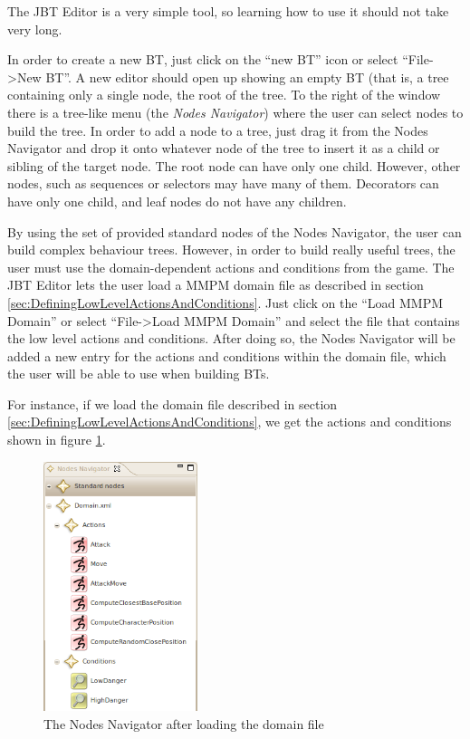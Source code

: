 \documentclass[a4paper]{article}
\begin{document}
The JBT Editor is a very simple tool, so learning how to use it should not take very long.

In order to create a new BT, just click on the ``new BT'' icon or select ``File->New BT''. A new editor should open up showing an empty BT (that is, a tree containing only a single node, the root of the tree. To the right of the window there is a tree-like menu (the \textit{Nodes Navigator}) where the user can select nodes to build the tree. In order to add a node to a tree, just drag it from the Nodes Navigator and drop it onto whatever node of the tree to insert it as a child or sibling of the target node. The root node can have only one child. However, other nodes, such as sequences or selectors may have many of them. Decorators can have only one child, and leaf nodes do not have any children.

By using the set of provided standard nodes of the Nodes Navigator, the user can build complex behaviour trees. However, in order to build really useful trees, the user must use the domain-dependent actions and conditions from the game. The JBT Editor lets the user load a MMPM domain file as described in section \ref{sec:DefiningLowLevelActionsAndConditions}. Just click on the ``Load MMPM Domain'' or select ``File->Load MMPM Domain'' and select the file that contains the low level actions and conditions. After doing so, the Nodes Navigator will be added a new entry for the actions and conditions within the domain file, which the user will be able to use when building BTs.

For instance, if we load the domain file described in section \ref{sec:DefiningLowLevelActionsAndConditions}, we get the actions and conditions shown in figure \ref{fig:LoadedDomain}.

\begin{figure}
 \centering
 \includegraphics[width=0.4\textwidth]{./Images/LoadedDomain.png}
 \caption{The Nodes Navigator after loading the domain file}
 \label{fig:LoadedDomain}
\end{figure}
\end{document}
